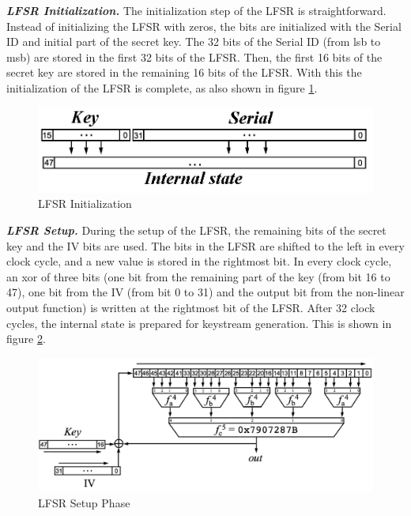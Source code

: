 \textit{\textbf{LFSR Initialization.}} The initialization step of the LFSR is straightforward. Instead of initializing the LFSR with zeros, the bits are initialized with the Serial ID and initial part of the secret key. The 32 bits of the Serial ID (from lsb to msb) are stored in the first 32 bits of the LFSR. Then, the first 16 bits of the secret key are stored in the remaining 16 bits of the LFSR. With this the initialization of the LFSR is complete, as also shown in figure \ref{fig:hitag2-1}.\\

\begin{figure}[h!]
	\centering
		\includegraphics[width=5in]{./figures/hitag2-1.PNG}
	\caption{LFSR Initialization}	
	\label{fig:hitag2-1}
\end{figure}

\textit{\textbf{LFSR Setup.}} During the setup of the LFSR, the remaining bits of the secret key and the IV bits are used. The bits in the LFSR are shifted to the left in every clock cycle, and a new value is stored in the rightmost bit. In every clock cycle, an xor of three bits (one bit from the remaining part of the key (from bit 16 to 47), one bit from the IV (from bit 0 to 31) and the output bit from the non-linear output function) is written at the rightmost bit of the LFSR. After 32 clock cycles, the internal state is prepared for keystream generation. This is shown in figure \ref{fig:hitag2-2}.

\begin{figure}[h!]
	\centering
		\includegraphics[width=5in]{./figures/hitag2-2.PNG}
	\caption{LFSR Setup Phase}	
	\label{fig:hitag2-2}
\end{figure}

